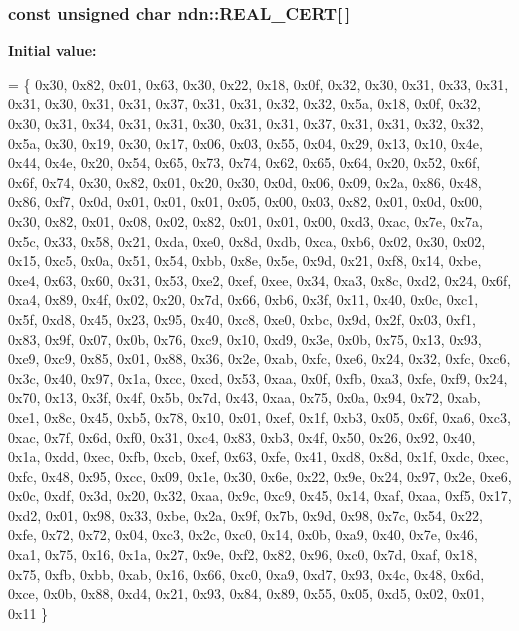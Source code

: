 \begin{DoxyVerb}
\subsubsection[{\texorpdfstring{R\+E\+A\+L\+\_\+\+C\+E\+RT}{REAL\_CERT}}]{\setlength{\rightskip}{0pt plus 5cm}const unsigned char ndn\+::\+R\+E\+A\+L\+\_\+\+C\+E\+RT\mbox{[}$\,$\mbox{]}}\hypertarget{namespacendn_a74bb1a0226288acb205d1a984d647b28}{}\label{namespacendn_a74bb1a0226288acb205d1a984d647b28}
{\bfseries Initial value\+:}
\begin{DoxyCode}
= \{
0x30, 0x82, 0x01, 0x63, 0x30, 0x22, 0x18, 0x0f, 0x32, 0x30, 0x31, 0x33, 0x31, 0x31, 0x30,
0x31, 0x31, 0x37, 0x31, 0x31, 0x32, 0x32, 0x5a, 0x18, 0x0f, 0x32, 0x30, 0x31, 0x34, 0x31,
0x31, 0x30, 0x31, 0x31, 0x37, 0x31, 0x31, 0x32, 0x32, 0x5a, 0x30, 0x19, 0x30, 0x17, 0x06,
0x03, 0x55, 0x04, 0x29, 0x13, 0x10, 0x4e, 0x44, 0x4e, 0x20, 0x54, 0x65, 0x73, 0x74, 0x62,
0x65, 0x64, 0x20, 0x52, 0x6f, 0x6f, 0x74, 0x30, 0x82, 0x01, 0x20, 0x30, 0x0d, 0x06, 0x09,
0x2a, 0x86, 0x48, 0x86, 0xf7, 0x0d, 0x01, 0x01, 0x01, 0x05, 0x00, 0x03, 0x82, 0x01, 0x0d,
0x00, 0x30, 0x82, 0x01, 0x08, 0x02, 0x82, 0x01, 0x01, 0x00, 0xd3, 0xac, 0x7e, 0x7a, 0x5c,
0x33, 0x58, 0x21, 0xda, 0xe0, 0x8d, 0xdb, 0xca, 0xb6, 0x02, 0x30, 0x02, 0x15, 0xc5, 0x0a,
0x51, 0x54, 0xbb, 0x8e, 0x5e, 0x9d, 0x21, 0xf8, 0x14, 0xbe, 0xe4, 0x63, 0x60, 0x31, 0x53,
0xe2, 0xef, 0xee, 0x34, 0xa3, 0x8c, 0xd2, 0x24, 0x6f, 0xa4, 0x89, 0x4f, 0x02, 0x20, 0x7d,
0x66, 0xb6, 0x3f, 0x11, 0x40, 0x0c, 0xc1, 0x5f, 0xd8, 0x45, 0x23, 0x95, 0x40, 0xc8, 0xe0,
0xbc, 0x9d, 0x2f, 0x03, 0xf1, 0x83, 0x9f, 0x07, 0x0b, 0x76, 0xc9, 0x10, 0xd9, 0x3e, 0x0b,
0x75, 0x13, 0x93, 0xe9, 0xc9, 0x85, 0x01, 0x88, 0x36, 0x2e, 0xab, 0xfc, 0xe6, 0x24, 0x32,
0xfc, 0xc6, 0x3c, 0x40, 0x97, 0x1a, 0xcc, 0xcd, 0x53, 0xaa, 0x0f, 0xfb, 0xa3, 0xfe, 0xf9,
0x24, 0x70, 0x13, 0x3f, 0x4f, 0x5b, 0x7d, 0x43, 0xaa, 0x75, 0x0a, 0x94, 0x72, 0xab, 0xe1,
0x8c, 0x45, 0xb5, 0x78, 0x10, 0x01, 0xef, 0x1f, 0xb3, 0x05, 0x6f, 0xa6, 0xc3, 0xac, 0x7f,
0x6d, 0xf0, 0x31, 0xc4, 0x83, 0xb3, 0x4f, 0x50, 0x26, 0x92, 0x40, 0x1a, 0xdd, 0xec, 0xfb,
0xcb, 0xef, 0x63, 0xfe, 0x41, 0xd8, 0x8d, 0x1f, 0xdc, 0xec, 0xfc, 0x48, 0x95, 0xcc, 0x09,
0x1e, 0x30, 0x6e, 0x22, 0x9e, 0x24, 0x97, 0x2e, 0xe6, 0x0c, 0xdf, 0x3d, 0x20, 0x32, 0xaa,
0x9c, 0xc9, 0x45, 0x14, 0xaf, 0xaa, 0xf5, 0x17, 0xd2, 0x01, 0x98, 0x33, 0xbe, 0x2a, 0x9f,
0x7b, 0x9d, 0x98, 0x7c, 0x54, 0x22, 0xfe, 0x72, 0x72, 0x04, 0xc3, 0x2c, 0xc0, 0x14, 0x0b,
0xa9, 0x40, 0x7e, 0x46, 0xa1, 0x75, 0x16, 0x1a, 0x27, 0x9e, 0xf2, 0x82, 0x96, 0xc0, 0x7d,
0xaf, 0x18, 0x75, 0xfb, 0xbb, 0xab, 0x16, 0x66, 0xc0, 0xa9, 0xd7, 0x93, 0x4c, 0x48, 0x6d,
0xce, 0x0b, 0x88, 0xd4, 0x21, 0x93, 0x84, 0x89, 0x55, 0x05, 0xd5, 0x02, 0x01, 0x11
\}
\end{DoxyCode}



\end{DoxyVerb}
